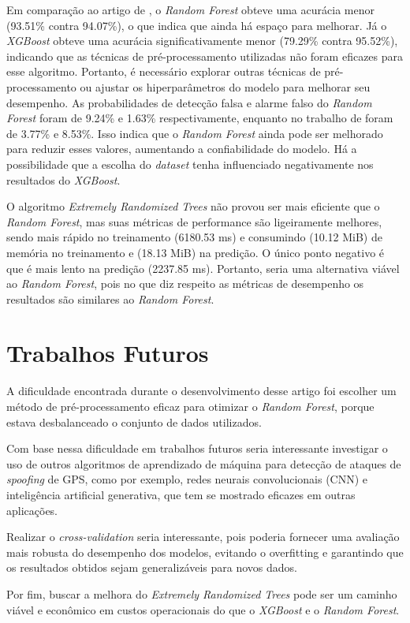 \documentclass[12pt]{article}
\begin{document}
Em comparação ao artigo de \cite{Aissou2021},
o \textit{Random Forest} obteve uma acurácia menor
(93.51\% contra 94.07\%), o que indica que ainda há espaço para melhorar.
Já o \textit{XGBoost} obteve uma acurácia significativamente menor
(79.29\% contra 95.52\%), indicando que as técnicas de pré-processamento
utilizadas não foram eficazes para esse algoritmo.
Portanto, é necessário explorar outras técnicas de pré-processamento
ou ajustar os hiperparâmetros do modelo para melhorar seu desempenho.
As probabilidades de detecção falsa e alarme falso do \textit{Random Forest}
foram de 9.24\% e 1.63\% respectivamente, enquanto no trabalho de \cite{Aissou2021}
foram de 3.77\% e 8.53\%. Isso indica que o \textit{Random Forest} ainda pode ser melhorado
para reduzir esses valores, aumentando a confiabilidade do modelo.
Há a possibilidade que a escolha do \textit{dataset} tenha influenciado negativamente
nos resultados do \textit{XGBoost}.

O algoritmo \textit{Extremely Randomized Trees}
não provou ser mais eficiente que o \textit{Random Forest},
mas suas métricas de performance são ligeiramente melhores, sendo
mais rápido no treinamento (6180.53 ms) e consumindo (10.12 MiB) de memória
no treinamento e (18.13 MiB) na predição.
O único ponto negativo é que é mais lento na predição (2237.85 ms).
Portanto, seria uma alternativa viável ao \textit{Random Forest},
pois no que diz respeito as métricas de desempenho os resultados
são similares ao \textit{Random Forest}.


\section{Trabalhos Futuros}

A dificuldade encontrada durante o desenvolvimento desse artigo foi escolher um
método de pré-processamento eficaz para otimizar o \textit{Random Forest},
porque estava desbalanceado o conjunto de dados utilizados. 

Com base nessa dificuldade em trabalhos futuros seria interessante
investigar o uso de outros algoritmos de aprendizado de máquina
para detecção de ataques de \textit{spoofing} de GPS,
como por exemplo, redes neurais convolucionais (CNN) e inteligência artificial generativa,
que tem se mostrado eficazes em outras aplicações.
\cite{cnn2023, elalamiDroneDefGANtGenerativeAIBased2024}

Realizar o \textit{cross-validation}
seria interessante, pois poderia fornecer uma avaliação mais robusta
do desempenho dos modelos, evitando o overfitting e garantindo que os resultados
obtidos sejam generalizáveis para novos dados.

Por fim, buscar a melhora do
\textit{Extremely Randomized Trees} pode ser um caminho viável
e econômico em custos operacionais do que o \textit{XGBoost}
e o \textit{Random Forest}.


\FloatBarrier
\printbibliography
\end{document}
